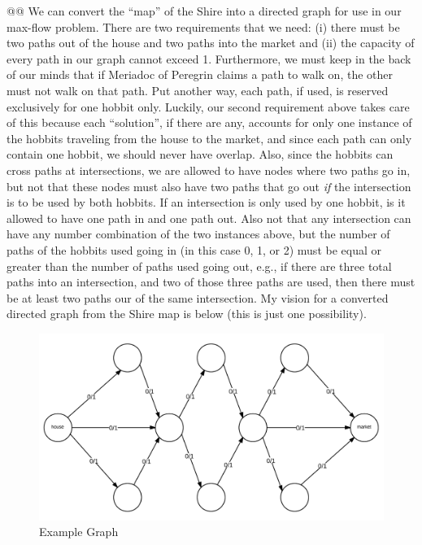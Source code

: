 \documentclass[10pt]{article}\usepackage[]{graphicx}\usepackage[]{xcolor}
\begin{document}
\begin{easylist}[enumerate]
    @@ We can convert the ``map'' of the Shire into a directed graph for use in our max-flow problem. There are two
    requirements that we need: (i) there must be two paths out of the house and two paths into the market and (ii) the
    capacity of every path in our graph cannot exceed 1. Furthermore, we must keep in the back of our minds that if
    Meriadoc of Peregrin claims a path to walk on, the other must not walk on that path. Put another way, each path, if
    used, is reserved exclusively for one hobbit only. Luckily, our second requirement above takes care of this because
    each ``solution'', if there are any, accounts for only one instance of the hobbits traveling from the house to the
    market, and since each path can only contain one hobbit, we should never have overlap. Also, since the hobbits can
    cross paths at intersections, we are allowed to have nodes where two paths go in, but not that these nodes must also
    have two paths that go out \textit{if} the intersection is to be used by both hobbits. If an intersection is only
    used by one hobbit, is it allowed to have one path in and one path out. Also not that any intersection can have any
    number combination of the two instances above, but the number of paths of the hobbits used going in (in this case
    0, 1, or 2) must be equal or greater than the number of paths used going out, e.g., if there are three total paths
    into an intersection, and two of those three paths are used, then there must be at least two paths our of the same
    intersection. My vision for a converted directed graph from the Shire map is below (this is just one possibility).

    \begin{figure}[H]
        \centering
        \includegraphics[scale=0.5]{./img/ps9-4.png}
        \caption{Example Graph}
    \end{figure}


\end{easylist}
\end{document}
